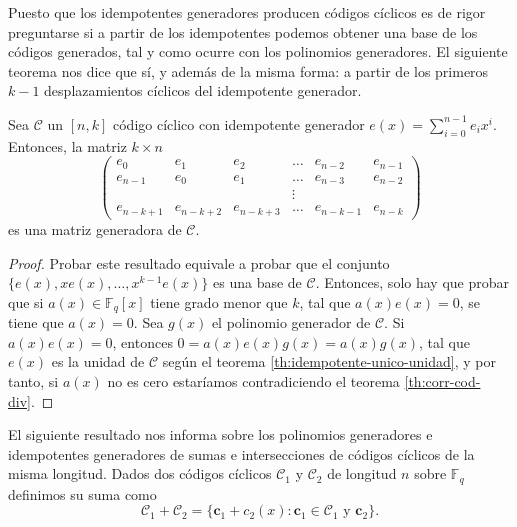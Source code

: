 Puesto que los idempotentes generadores producen códigos cíclicos es de rigor preguntarse si a partir de los idempotentes podemos obtener una base de los códigos generados, tal y como ocurre con los polinomios generadores.
El siguiente teorema nos dice que sí, y además de la misma forma: a partir de los primeros \(k - 1\) desplazamientos cíclicos del idempotente generador.

\begin{theorem}
  Sea \(\mathcal C\) un \([n, k]\) código cíclico con idempotente generador \(e(x) = \sum_{i=0}^{n-1}e_ix^i\).
  Entonces, la matriz \(k \times n\)
  \[
    \begin{pmatrix*}
      e_0 & e_1 & e_2 & \dots & e_{n-2} & e_{n-1} \\
      e_{n-1} & e_0 & e_1 & \dots & e_{n-3} & e_{n-2} \\
       & & & \vdots & & \\
      e_{n-k+1} & e_{n-k+2} & e_{n-k+3} & \dots & e_{n-k-1} & e_{n-k}
    \end{pmatrix*}
  \] es una matriz generadora de \(\mathcal C\).
\end{theorem}

\begin{proof}
  Probar este resultado equivale a probar que el conjunto \(\{e(x), xe(x), \dots, x^{k-1}e(x)\}\) es una base de \(\mathcal C\).
  Entonces, solo hay que probar que si \(a(x) \in \mathbb F_q[x]\) tiene grado menor que \(k\), tal que \(a(x)e(x) = 0\), se tiene que \(a(x) = 0\).
  Sea \(g(x)\) el polinomio generador de \(\mathcal C\).
  Si \(a(x)e(x) = 0\), entonces \(0 = a(x)e(x)g(x) = a(x)g(x)\), tal que \(e(x)\) es la unidad de \(\mathcal C\) según el teorema \ref{th:idempotente-unico-unidad}, y por tanto, si \(a(x)\) no es cero estaríamos contradiciendo el teorema \ref{th:corr-cod-div}.
\end{proof}

El siguiente resultado nos informa sobre los polinomios generadores e idempotentes generadores de sumas e intersecciones de códigos cíclicos de la misma longitud.
Dados dos códigos cíclicos \(\mathcal C_1\) y \(\mathcal C_2\) de longitud \(n\) sobre \(\mathbb F_q\) definimos su suma como
\[
  \mathcal C_1 + \mathcal C_2 = \{\mathbf{c}_1 + c_2(x) : \mathbf{c}_1 \in \mathcal C_1 \text{ y } \mathbf{c}_2\}.
\]

